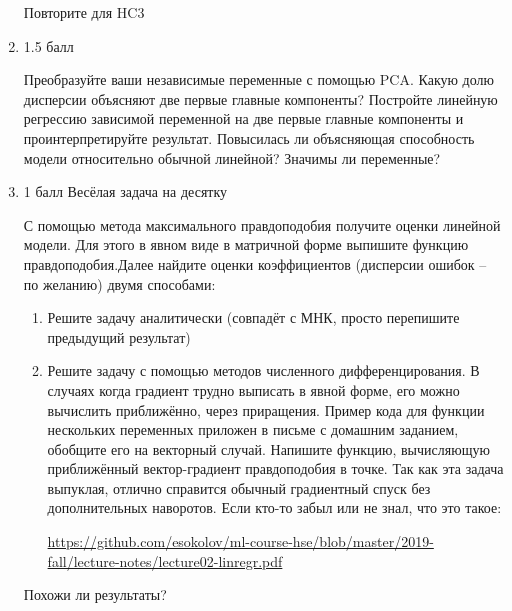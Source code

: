\documentclass[a4paper,12pt]{article}
\begin{document}
\begin{enumerate}
		 Повторите для HC3
		
	
		\item 1.5 балл
		
		Преобразуйте ваши независимые переменные с помощью PCA. Какую долю дисперсии объясняют две первые главные компоненты? Постройте линейную регрессию зависимой переменной на две первые главные компоненты и проинтерпретируйте результат. Повысилась ли объясняющая способность модели относительно обычной линейной? Значимы ли переменные? 
		
		\item 1 балл Весёлая задача на десятку
		
		С помощью метода максимального правдоподобия получите оценки линейной модели. Для этого в явном виде в матричной форме выпишите функцию правдоподобия.Далее найдите оценки коэффициентов (дисперсии ошибок -- по желанию) двумя способами:
		
		\begin{enumerate}
			\item Решите задачу аналитически (совпадёт с МНК, просто перепишите предыдущий результат)
			
			\item Решите задачу с помощью методов численного дифференцирования. В случаях когда градиент трудно выписать в явной форме, его можно вычислить приближённо, через приращения. Пример кода для функции нескольких переменных приложен в письме с домашним заданием, обобщите его на векторный случай. Напишите функцию, вычисляющую приближённый вектор-градиент правдоподобия в точке. Так как эта задача выпуклая, отлично справится обычный градиентный спуск без дополнительных наворотов. Если кто-то забыл или не знал, что это такое:
			
			 \href{https://github.com/esokolov/ml-course-hse/blob/master/2019-fall/lecture-notes/lecture02-linregr.pdf}{https://github.com/esokolov/ml-course-hse/blob/master/2019-fall/lecture-notes/lecture02-linregr.pdf}
			
		\end{enumerate}
	
		Похожи ли результаты?
	\end{enumerate}
	
\end{document}
